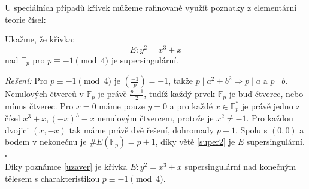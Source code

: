 \documentclass [12pt]{report}
\begin{document}

U speciálních případů křivek můžeme rafinovaně využít poznatky z elementární teorie čísel:


\begin{priklad}
Ukažme, že křivka:
 $$E : y^2 = x^3 + x$$
nad $\mathbb{F}_{p}$ pro $ p \equiv -1 \pmod{4}$ je supersingulární.
\end{priklad}
\textit{Řešení: } Pro $p \equiv -1 \pmod{4}$ je $\genfrac{(}{)}{}{}{-1}{p} = -1$, takže $p \mid a^2 + b^2 \Rightarrow p \mid a$ a $p \mid b$. Nenulových čtverců v $\mathbb{F}_p$ je právě $\frac{p-1}{2}$, tudíž každý prvek $\mathbb{F}_p$ je buď čtverec, nebo mínus čtverec. Pro $x= 0$ máme pouze $y = 0$ a pro každé $x \in \mathbb{F}_p^*$ je právě jedno z čísel $x^3+x, (-x)^3-x$ nenulovým čtvercem, protože je $x^2 \neq -1$. Pro každou dvojici $(x,-x)$ tak máme právě dvě řešení, dohromady $p-1$. Spolu s $(0,0)$ a bodem v nekonečnu je $\# E(\mathbb{F}_p) = p+1$, díky větě \ref{super2} je $E$ supersingulární. \hfill $\square$\\

Díky poznámce \ref{uzaver} je křivka $E: y^2 = x^3+x$ supersingulární nad konečným tělesem s charakteristikou $p \equiv -1 \pmod{4}$.\\
\end{document}
